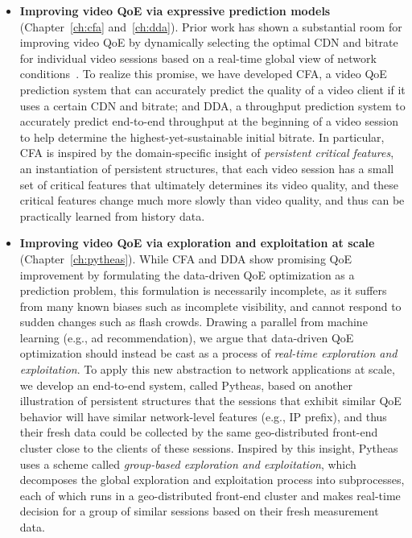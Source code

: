 \begin{itemize}

\item {\bf Improving video QoE via expressive prediction models} 
(Chapter~\ref{ch:cfa} and~\ref{ch:dda}). 
Prior work has shown a substantial room for improving video QoE by 
dynamically selecting the optimal CDN and bitrate for individual video 
sessions based on a real-time global view of network 
conditions~\cite{sigcomm12}.
To realize this promise, we have developed CFA, a video QoE prediction 
system that can accurately predict the quality of a video client if it uses 
a certain CDN and bitrate; and DDA, a throughput prediction system
to accurately predict end-to-end throughput at the beginning of a 
 video session to help determine the highest-yet-sustainable initial bitrate.
In particular, CFA is inspired by the domain-specific insight of 
{\em persistent critical features}, an instantiation of persistent structures, that
each video session has a small set of critical features that ultimately 
determines its video quality, and these critical features change much 
more slowly than video quality, and thus can be practically 
learned from history data.

\item {\bf Improving video QoE via exploration and exploitation at scale} 
(Chapter~\ref{ch:pytheas}). 
While CFA and DDA show promising QoE improvement by formulating the 
data-driven QoE optimization as a prediction problem, this formulation is necessarily 
incomplete, as it suffers from many known biases such as incomplete visibility, 
and cannot respond to sudden changes such as flash crowds.
Drawing a parallel from machine learning (e.g., ad recommendation), 
we argue that data-driven QoE optimization should instead be 
cast as a process of {\em real-time exploration and exploitation}. 
To apply this new abstraction to network applications at scale, 
we develop an end-to-end system, called Pytheas, based on 
another illustration of persistent structures that 
the sessions that exhibit similar QoE behavior will have similar network-level 
features (e.g., IP prefix), and thus their fresh data could be collected 
by the same geo-distributed front-end cluster close to the clients of
these sessions. Inspired by this insight, Pytheas uses a scheme called 
{\em group-based exploration and exploitation},  which decomposes the 
global exploration and exploitation process into 
subprocesses, each of which runs in a geo-distributed front-end cluster 
 and makes real-time decision for a group of similar sessions
based on their fresh measurement data.


\end{itemize}
